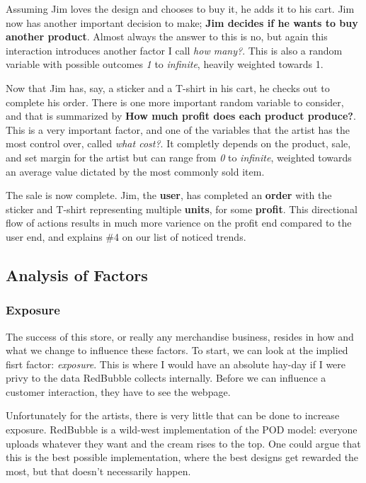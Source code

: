 \documentclass[]{article}
\begin{document}
Assuming Jim loves the design and chooses to buy it, he adds it to his
cart. Jim now has another important decision to make; \textbf{Jim
decides if he wants to buy another product}. Almost always the answer to
this is no, but again this interaction introduces another factor I call
\emph{how many?}. This is also a random variable with possible outcomes
\emph{1} to \emph{infinite}, heavily weighted towards 1.

Now that Jim has, say, a sticker and a T-shirt in his cart, he checks
out to complete his order. There is one more important random variable
to consider, and that is summarized by \textbf{How much profit does each
product produce?}. This is a very important factor, and one of the
variables that the artist has the most control over, called \emph{what
cost?}. It completly depends on the product, sale, and set margin for
the artist but can range from \emph{0} to \emph{infinite}, weighted
towards an average value dictated by the most commonly sold item.

The sale is now complete. Jim, the \textbf{user}, has completed an
\textbf{order} with the sticker and T-shirt representing multiple
\textbf{units}, for some \textbf{profit}. This directional flow of
actions results in much more varience on the profit end compared to the
user end, and explains \#4 on our list of noticed trends.

\subsection{Analysis of Factors}\label{analysis-of-factors}

\subsubsection{Exposure}\label{exposure}

The success of this store, or really any merchandise business, resides
in how and what we change to influence these factors. To start, we can
look at the implied fisrt factor: \emph{exposure}. This is where I would
have an absolute hay-day if I were privy to the data RedBubble collects
internally. Before we can influence a customer interaction, they have to
see the webpage.

Unfortunately for the artists, there is very little that can be done to
increase exposure. RedBubble is a wild-west implementation of the POD
model: everyone uploads whatever they want and the cream rises to the
top. One could argue that this is the best possible implementation,
where the best designs get rewarded the most, but that doesn't
necessarily happen.
\end{document}
